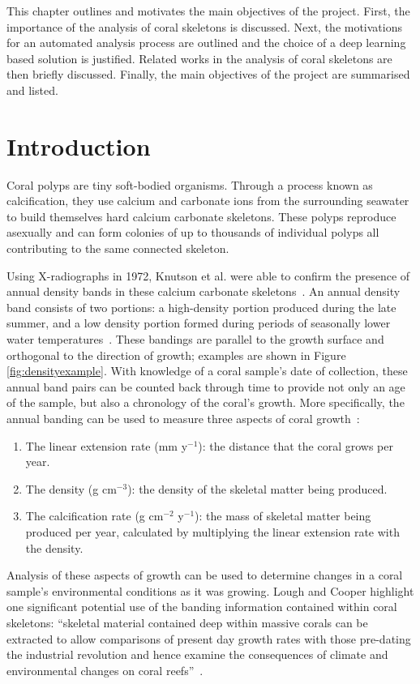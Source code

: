 This chapter outlines and motivates the main objectives of the project. First, the importance of the analysis of coral skeletons is discussed. Next, the motivations for an automated analysis process are outlined and the choice of a deep learning based solution is justified. Related works in the analysis of coral skeletons are then briefly discussed. Finally, the main objectives of the project are summarised and listed.

\section{Introduction}

Coral polyps are tiny soft-bodied organisms. Through a process known as calcification, they use calcium and carbonate ions from the surrounding seawater to build themselves hard calcium carbonate skeletons. These polyps reproduce asexually and can form colonies of up to thousands of individual polyps all contributing to the same connected skeleton.

Using X-radiographs in 1972, Knutson et al. were able to confirm the presence of annual density bands in these calcium carbonate skeletons~\cite{knutson}. An annual density band consists of two portions: a high-density portion produced during the late summer, and a low density portion formed during periods of seasonally lower water temperatures~\cite{highlow}. These bandings are parallel to the growth surface and orthogonal to the direction of growth; examples are shown in Figure \ref{fig:densityexample}. With knowledge of a coral sample's date of collection, these annual band pairs can be counted back through time to provide not only an age of the sample, but also a chronology of the coral's growth. More specifically, the annual banding can be used to measure three aspects of coral growth~\cite{lough2011new}:

\begin{enumerate}
    \item The linear extension rate (mm y$^{-1}$): the distance that the coral grows per year.
    \item The density (g cm$^{-3}$): the density of the skeletal matter being produced.
    \item The calcification rate (g cm$^{-2}$ y$^{-1}$): the mass of skeletal matter being produced per year, calculated by multiplying the linear extension rate with the density.
\end{enumerate}

Analysis of these aspects of growth can be used to determine changes in a coral sample's environmental conditions as it was growing. Lough and Cooper highlight one significant potential use of the banding information contained within coral skeletons: ``skeletal material contained deep within massive corals can be extracted to allow comparisons of present day growth rates with those pre-dating the industrial revolution and hence examine the consequences of climate and environmental changes on coral reefs''~\cite{lough2011new}.

